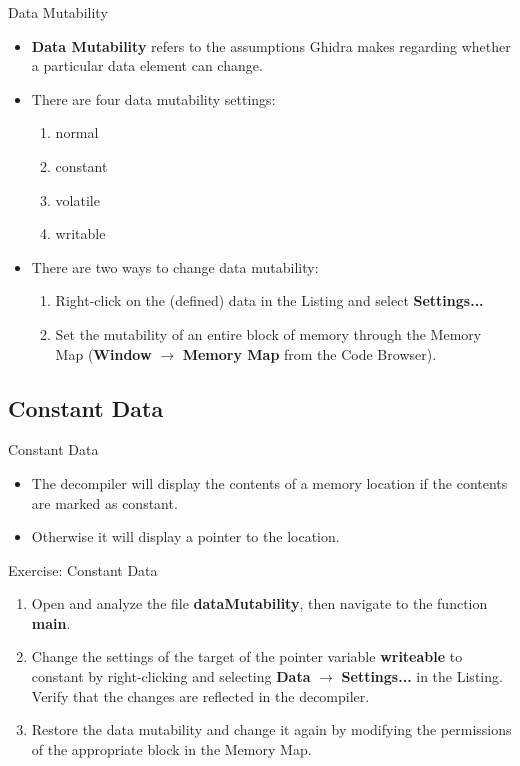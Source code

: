 \documentclass{beamer}
\begin{document}
\begin{frame}
\begin{block}{Data Mutability}
\begin{itemize}
\item \textbf{Data Mutability} refers to the assumptions Ghidra makes regarding whether a particular data element can change.
\item There are four data mutability settings:
\begin{enumerate}
\item normal
\item constant
\item volatile
\item writable
\end{enumerate}
\item There are two ways to change data mutability:
\begin{enumerate}
\item Right-click on the (defined) data in the Listing and select \textbf{Settings...} 
\item Set the mutability of an entire block of memory through the Memory Map (\textbf{Window} $\rightarrow$ \textbf{Memory Map} from the Code Browser).
\end{enumerate}
\end{itemize}
\end{block}
\end{frame}

\subsection{Constant Data}

\begin{frame}
\begin{block}{Constant Data}
\begin{itemize}
\item The decompiler will display the contents of a memory location if the contents are marked as constant.
\item Otherwise it will display a pointer to the location.
\end{itemize}
\end{block}
\end{frame}

\begin{frame}
\begin{block}{Exercise: Constant Data}
\begin{enumerate}
\item Open and analyze the file \textbf{dataMutability}, then navigate to the function \textbf{main}.
\item Change the settings of the target of the pointer variable \textbf{writeable} to constant by right-clicking and selecting \textbf{Data} $\rightarrow$ \textbf{Settings...} 
in the Listing.  Verify that the changes are reflected in the decompiler.
\item Restore the data mutability and change it again by modifying the permissions of the appropriate block in the Memory Map. 
\end{enumerate}
\end{block}
\end{frame}
\end{document}
